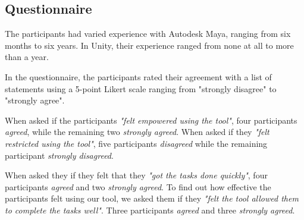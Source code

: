 \subsection{Questionnaire}
The participants had varied experience with Autodesk Maya, ranging from six months to six years. In Unity, their experience ranged from none at all to more than a year.

In the questionnaire, the participants rated their agreement with a list of statements using a 5-point Likert scale ranging from "strongly disagree" to "strongly agree". 


When asked if the participants \textit{"felt empowered using the tool"}, four participants \textit{agreed}, while the remaining two \textit{strongly agreed}. When asked if they \textit{"felt restricted using the tool"}, five participants \textit{disagreed} while the remaining participant \textit{strongly disagreed}.

When asked they if they felt that they \textit{"got the tasks done quickly"}, four participants \textit{agreed} and two \textit{strongly agreed}. To find out how effective the participants felt using our tool, we asked them if they \textit{"felt the tool allowed them to complete the tasks well"}. Three participants \textit{agreed} and three \textit{strongly agreed}.


